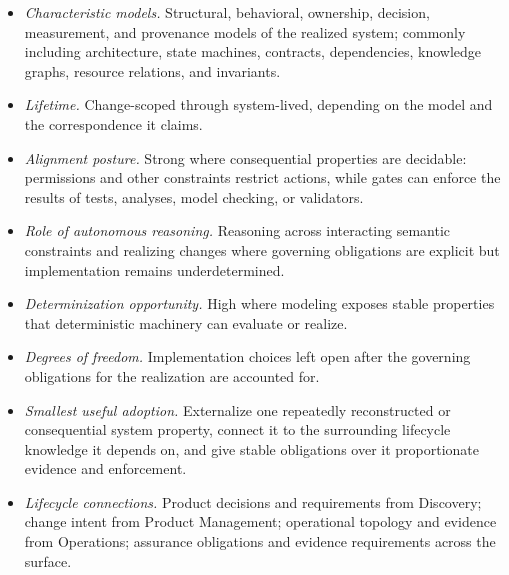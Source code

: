 \begin{itemize}
\tightlist
\item
  \emph{Characteristic models.} Structural, behavioral, ownership, decision, measurement, and provenance models of the realized system; commonly including architecture, state machines, contracts, dependencies, knowledge graphs, resource relations, and invariants.
\item
  \emph{Lifetime.} Change-scoped through system-lived, depending on the model and the correspondence it claims.
\item
  \emph{Alignment posture.} Strong where consequential properties are decidable: permissions and other constraints restrict actions, while gates can enforce the results of tests, analyses, model checking, or validators.
\item
  \emph{Role of autonomous reasoning.} Reasoning across interacting semantic constraints and realizing changes where governing obligations are explicit but implementation remains underdetermined.
\item
  \emph{Determinization opportunity.} High where modeling exposes stable properties that deterministic machinery can evaluate or realize.
\item
  \emph{Degrees of freedom.} Implementation choices left open after the governing obligations for the realization are accounted for.
\item
  \emph{Smallest useful adoption.} Externalize one repeatedly reconstructed or consequential system property, connect it to the surrounding lifecycle knowledge it depends on, and give stable obligations over it proportionate evidence and enforcement.
\item
  \emph{Lifecycle connections.} Product decisions and requirements from Discovery; change intent from Product Management; operational topology and evidence from Operations; assurance obligations and evidence requirements across the surface.
\end{itemize}
